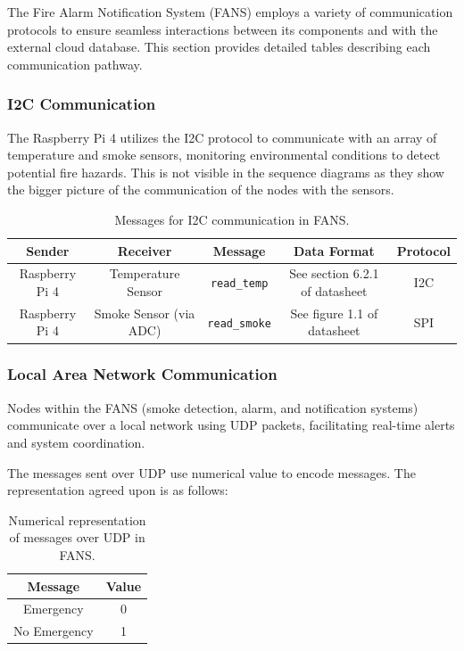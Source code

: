 The Fire Alarm Notification System (FANS) employs a variety of communication protocols to ensure seamless interactions
between its components and with the external cloud database. This section provides detailed tables describing each
communication pathway.

\subsubsection{I2C Communication}

The Raspberry Pi 4 utilizes the I2C protocol to communicate with an array of temperature and smoke sensors, monitoring
environmental conditions to detect potential fire hazards. This is not visible in the sequence diagrams as they show
the bigger picture of the communication of the nodes with the sensors.

\begin{table}[H]
    \centering
    \begin{tabular}{| c | c | c | c | c |}
        \hline
        Sender         & Receiver               & Message              & Data Format                                          & Protocol                 \\
        \hline
        Raspberry Pi 4 & Temperature Sensor     & \texttt{read\_temp}  & See section 6.2.1 of datasheet \cite{temp-datasheet} & I2C                      \\
        \hline
        Raspberry Pi 4 & Smoke Sensor (via ADC) & \texttt{read\_smoke} & See figure 1.1 of datasheet \cite{adc-datasheet}     & SPI \cite{adc-datasheet} \\
        \hline
    \end{tabular}
    \caption{Messages for I2C communication in FANS.}
\end{table}

\subsubsection{Local Area Network Communication}

Nodes within the FANS (smoke detection, alarm, and notification systems) communicate over a local network using UDP
packets, facilitating real-time alerts and system coordination.

The messages sent over UDP use numerical value to encode messages. The representation agreed upon is as follows:

\begin{table}[H]
    \centering
    \begin{tabular}{| c | c |}
        \hline
        Message      & Value \\
        \hline
        Emergency    & 0     \\
        \hline
        No Emergency & 1     \\
        \hline
    \end{tabular}
    \caption{Numerical representation of messages over UDP in FANS.}
\end{table}

